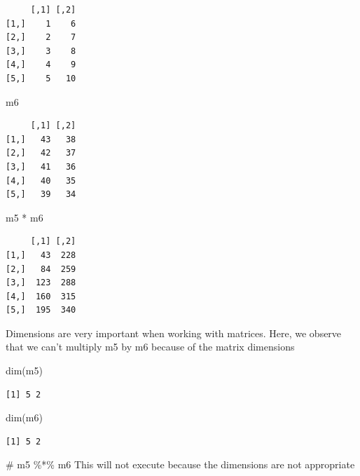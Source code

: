 \documentclass[
  letterpaper,
  DIV=11,
  numbers=noendperiod]{scrreprt}
\newenvironment{Shaded}{\begin{snugshade}}{\end{snugshade}}
\newcommand{\CommentTok}[1]{\textcolor[rgb]{0.37,0.37,0.37}{#1}}
\newcommand{\FunctionTok}[1]{\textcolor[rgb]{0.28,0.35,0.67}{#1}}
\newcommand{\NormalTok}[1]{\textcolor[rgb]{0.00,0.23,0.31}{#1}}
\newcommand{\SpecialCharTok}[1]{\textcolor[rgb]{0.37,0.37,0.37}{#1}}
\begin{document}
\begin{verbatim}
     [,1] [,2]
[1,]    1    6
[2,]    2    7
[3,]    3    8
[4,]    4    9
[5,]    5   10
\end{verbatim}

\begin{Shaded}
\begin{Highlighting}[]
\NormalTok{m6}
\end{Highlighting}
\end{Shaded}

\begin{verbatim}
     [,1] [,2]
[1,]   43   38
[2,]   42   37
[3,]   41   36
[4,]   40   35
[5,]   39   34
\end{verbatim}

\begin{Shaded}
\begin{Highlighting}[]
\NormalTok{m5 }\SpecialCharTok{*}\NormalTok{ m6}
\end{Highlighting}
\end{Shaded}

\begin{verbatim}
     [,1] [,2]
[1,]   43  228
[2,]   84  259
[3,]  123  288
[4,]  160  315
[5,]  195  340
\end{verbatim}

Dimensions are very important when working with matrices. Here, we
observe that we can't multiply m5 by m6 because of the matrix dimensions

\begin{Shaded}
\begin{Highlighting}[]
\FunctionTok{dim}\NormalTok{(m5)}
\end{Highlighting}
\end{Shaded}

\begin{verbatim}
[1] 5 2
\end{verbatim}

\begin{Shaded}
\begin{Highlighting}[]
\FunctionTok{dim}\NormalTok{(m6)}
\end{Highlighting}
\end{Shaded}

\begin{verbatim}
[1] 5 2
\end{verbatim}

\begin{Shaded}
\begin{Highlighting}[]
\CommentTok{\# m5 \%*\% m6 This will not execute because the dimensions are not appropriate}
\end{Highlighting}
\end{Shaded}
\end{document}
